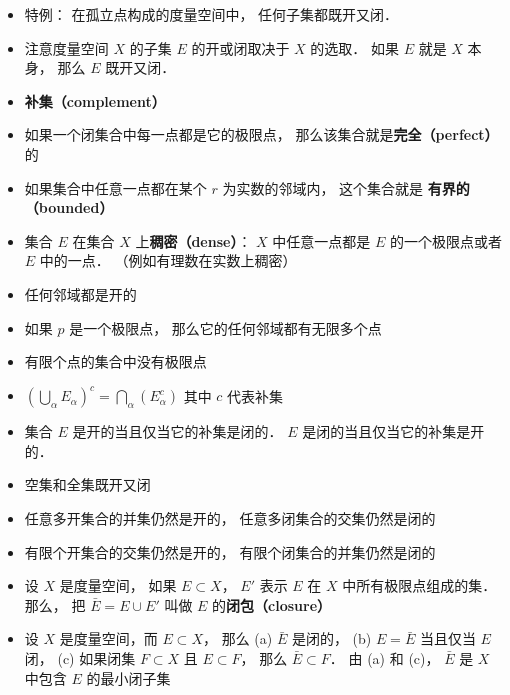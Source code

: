 \begin{itemize}
\item 特例： 在孤立点构成的度量空间中， 任何子集都既开又闭．

\item 注意度量空间 $X$ 的子集 $E$ 的开或闭取决于 $X$ 的选取． 如果 $E$ 就是 $X$ 本身， 那么 $E$ 既开又闭．

\item \textbf{补集（complement）}

\item 如果一个闭集合中每一点都是它的极限点， 那么该集合就是\textbf{完全（perfect）} 的

\item 如果集合中任意一点都在某个 $r$ 为实数的邻域内， 这个集合就是 \textbf{有界的（bounded）}

\item 集合 $E$ 在集合 $X$ 上\textbf{稠密（dense）}： $X$ 中任意一点都是 $E$ 的一个极限点或者 $E$ 中的一点． （例如有理数在实数上稠密）

\item 任何邻域都是开的

\item 如果 $p$ 是一个极限点， 那么它的任何邻域都有无限多个点

\item 有限个点的集合中没有极限点

\item $(\bigcup_\alpha E_\alpha)^c = \bigcap_\alpha (E_\alpha^c)$ 其中 $c$ 代表补集

\item 集合 $E$ 是开的当且仅当它的补集是闭的． $E$ 是闭的当且仅当它的补集是开的．

\item 空集和全集既开又闭

\item 任意多开集合的并集仍然是开的， 任意多闭集合的交集仍然是闭的

\item 有限个开集合的交集仍然是开的， 有限个闭集合的并集仍然是闭的

\item 设 $X$ 是度量空间， 如果 $E \subset X$， $E'$ 表示 $E$ 在 $X$ 中所有极限点组成的集． 那么， 把 $\bar E = E \cup E'$ 叫做 $E$ 的\textbf{闭包（closure）}

\item 设 $X$ 是度量空间，而 $E \subset X$， 那么 (a) $\bar E$ 是闭的， (b) $E = \bar E$ 当且仅当 $E$ 闭， (c) 如果闭集 $F \subset X$ 且 $E \subset F$， 那么 $\bar E \subset F$． 由 (a) 和 (c)， $\bar E$ 是 $X$ 中包含 $E$ 的最小闭子集


\end{itemize}
